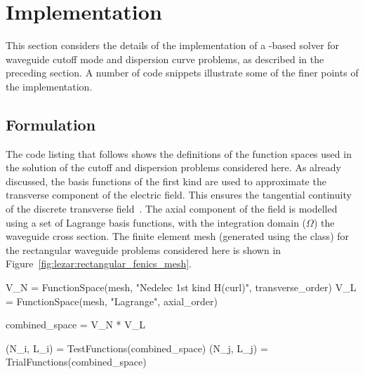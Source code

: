 \section{Implementation}
\label{lezar:sec:Implementation}

This section considers the details of the implementation of a
\fenics-based solver for waveguide cutoff mode and dispersion
curve problems, as described in the preceding section.
A number of code snippets
illustrate some of the finer points of the implementation.

\subsection{Formulation}

The code listing that follows shows the definitions of the function
spaces used in the solution of the cutoff and dispersion problems
considered here. As already discussed, the \nedelec{} basis functions of
the first kind are used to approximate the transverse component of the
electric field. This ensures the tangential continuity of the discrete
transverse field~\citep{Jin2002}.  The axial component of the field is
modelled using a set of Lagrange basis functions, with the integration
domain ($\Omega$) the waveguide cross section. The finite element mesh
(generated using the \dolfin{}  class) for the
rectangular waveguide problems considered here is shown in
Figure~\ref{fig:lezar:rectangular_fenics_mesh}.
\begin{python}
V_N = FunctionSpace(mesh, "Nedelec 1st kind H(curl)", transverse_order)
V_L = FunctionSpace(mesh, "Lagrange", axial_order)

combined_space = V_N * V_L

(N_i, L_i) = TestFunctions(combined_space)
(N_j, L_j) = TrialFunctions(combined_space)
\end{python}

